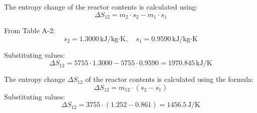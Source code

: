 The entropy change of the reactor contents is calculated using:  
\[
\Delta S_{12} = m_2 \cdot s_2 - m_1 \cdot s_1
\]  

From Table A-2:  
\[
s_2 = 1.3000 \, \text{kJ/kg·K}, \quad s_1 = 0.9590 \, \text{kJ/kg·K}
\]  

Substituting values:  
\[
\Delta S_{12} = 5755 \cdot 1.3000 - 5755 \cdot 0.9590 = 1970.845 \, \text{kJ/K}
\]

The entropy change \( \Delta S_{12} \) of the reactor contents is calculated using the formula:  
\[
\Delta S_{12} = m_{12} \cdot (s_{2} - s_{1})
\]  
Substituting values:  
\[
\Delta S_{12} = 3755 \cdot (1.252 - 0.861) = 1456.5 \, \text{J/K}
\]